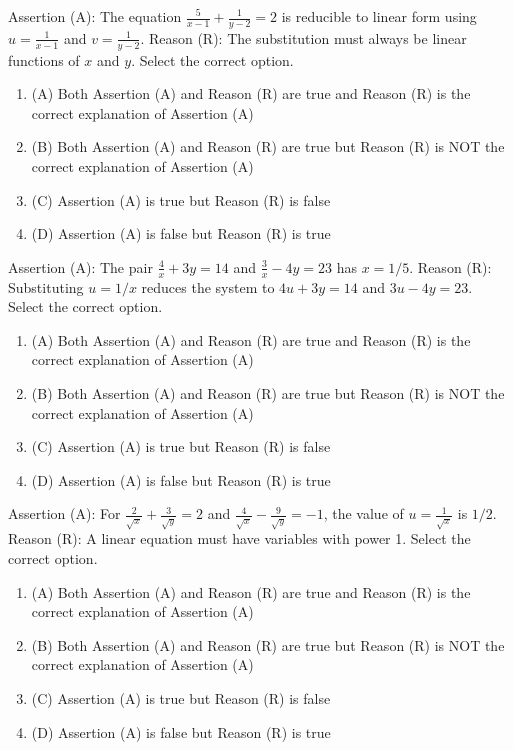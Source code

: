 \documentclass[12pt,a4paper]{exam}
\begin{document}
\begin{questions}
\question[1] Assertion (A): The equation $\frac{5}{x-1} + \frac{1}{y-2} = 2$ is reducible to linear form using $u = \frac{1}{x-1}$ and $v = \frac{1}{y-2}$. Reason (R): The substitution must always be linear functions of $x$ and $y$. Select the correct option.
\begin{enumerate}[label=(\Alph*)]
  \item (A) Both Assertion (A) and Reason (R) are true and Reason (R) is the correct explanation of Assertion (A)
  \item (B) Both Assertion (A) and Reason (R) are true but Reason (R) is NOT the correct explanation of Assertion (A)
  \item (C) Assertion (A) is true but Reason (R) is false
  \item (D) Assertion (A) is false but Reason (R) is true
\end{enumerate}
\vspace{0.15cm}

\question[1] Assertion (A): The pair $\frac{4}{x} + 3y = 14$ and $\frac{3}{x} - 4y = 23$ has $x = 1/5$. Reason (R): Substituting $u = 1/x$ reduces the system to $4u + 3y = 14$ and $3u - 4y = 23$. Select the correct option.
\begin{enumerate}[label=(\Alph*)]
  \item (A) Both Assertion (A) and Reason (R) are true and Reason (R) is the correct explanation of Assertion (A)
  \item (B) Both Assertion (A) and Reason (R) are true but Reason (R) is NOT the correct explanation of Assertion (A)
  \item (C) Assertion (A) is true but Reason (R) is false
  \item (D) Assertion (A) is false but Reason (R) is true
\end{enumerate}
\vspace{0.15cm}

\question[1] Assertion (A): For $\frac{2}{\sqrt{x}} + \frac{3}{\sqrt{y}} = 2$ and $\frac{4}{\sqrt{x}} - \frac{9}{\sqrt{y}} = -1$, the value of $u = \frac{1}{\sqrt{x}}$ is $1/2$. Reason (R): A linear equation must have variables with power 1. Select the correct option.
\begin{enumerate}[label=(\Alph*)]
  \item (A) Both Assertion (A) and Reason (R) are true and Reason (R) is the correct explanation of Assertion (A)
  \item (B) Both Assertion (A) and Reason (R) are true but Reason (R) is NOT the correct explanation of Assertion (A)
  \item (C) Assertion (A) is true but Reason (R) is false
  \item (D) Assertion (A) is false but Reason (R) is true
\end{enumerate}
\vspace{0.15cm}


\end{questions}
\end{document}
